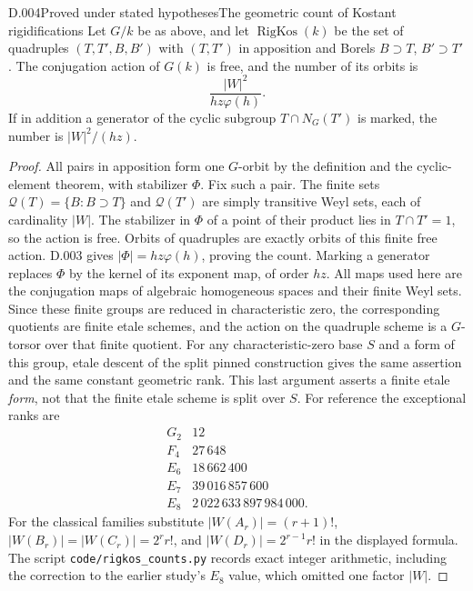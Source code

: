 \begin{saresult}{D.004}{Proved under stated hypotheses}{The geometric count of Kostant rigidifications}
Let $G/k$ be as above, and let $\operatorname{RigKos}(k)$ be the set of
quadruples $(T,T',B,B')$ with $(T,T')$ in apposition and Borels
$B\supset T$, $B'\supset T'$.  The conjugation action of $G(k)$ is
free, and the number of its orbits is
\[
 \frac{|W|^2}{h z\varphi(h)}.
\]
If in addition a generator of the cyclic subgroup $T\cap N_G(T')$
is marked, the number is $|W|^2/(hz)$.
\end{saresult}
\begin{proof}
All pairs in apposition form one $G$-orbit by the definition and the
cyclic-element theorem, with stabilizer $\Phi$.  Fix such a pair.
The finite sets $\mathcal Q(T)=\{B:B\supset T\}$ and
$\mathcal Q(T')$ are simply transitive Weyl sets, each of cardinality
$|W|$.  The stabilizer in $\Phi$ of a point of their product lies in
$T\cap T'=1$, so the action is free.  Orbits of quadruples are exactly
orbits of this finite free action.  D.003 gives $|\Phi|=hz\varphi(h)$,
proving the count.  Marking a generator replaces $\Phi$ by the kernel
of its exponent map, of order $hz$.
All maps used here are the conjugation maps of algebraic homogeneous
spaces and their finite Weyl sets.  Since these finite groups are
reduced in characteristic zero, the corresponding quotients are
finite etale schemes, and the action on the quadruple scheme is a
$G$-torsor over that finite quotient.  For any characteristic-zero
base $S$ and a form of this group, etale descent of the split pinned
construction gives the same assertion and the same constant geometric
rank.  This last argument asserts a finite etale \emph{form}, not
that the finite etale scheme is split over $S$.
For reference the exceptional ranks are
\[
\begin{array}{c|r}
G_2&12\\ F_4&27\,648\\ E_6&18\,662\,400\\
E_7&39\,016\,857\,600\\ E_8&2\,022\,633\,897\,984\,000.
\end{array}
\]
For the classical families substitute
$|W(A_r)|=(r+1)!$, $|W(B_r)|=|W(C_r)|=2^r r!$,
and $|W(D_r)|=2^{r-1}r!$ in the displayed formula.
The script \texttt{code/rigkos\_counts.py} records exact
integer arithmetic, including the correction to the
earlier study's $E_8$ value, which omitted one factor
$|W|$.
\end{proof}

